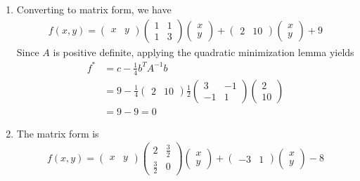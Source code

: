 \documentclass[12pt]{article}
\begin{document}
\begin{problem}[2]
\begin{enumerate}[label=(\alph*)]
	\item Converting to matrix form, we have
	\begin{align*}
		f(x,y) = \begin{pmatrix} x&y \end{pmatrix}  \begin{pmatrix} 1&1\\1&3 \end{pmatrix} \begin{pmatrix} x\\y \end{pmatrix}  + \begin{pmatrix} 2&10 \end{pmatrix}  \begin{pmatrix} x\\y \end{pmatrix} + 9
	\end{align*}
	Since $ A$ is positive definite, applying the quadratic minimization lemma yields 
\begin{align*}
	f^* &= c - \frac{1}{4}b^{T}A^{-1}b\\
	    &= 9 - \frac{1}{4} \begin{pmatrix} 2&10 \end{pmatrix} \frac{1}{2}\begin{pmatrix} 3&-1\\-1&1 \end{pmatrix} \begin{pmatrix} 2\\10 \end{pmatrix}  \\
	    &= 9-9=0 
\end{align*}
\item The matrix form is
	\begin{align*}
	f(x,y) = \begin{pmatrix} x&y \end{pmatrix}  \begin{pmatrix} 2&\frac{3}{2}\\\frac{3}{2}&0 \end{pmatrix} \begin{pmatrix} x\\y \end{pmatrix}  + \begin{pmatrix} -3&1 \end{pmatrix}  \begin{pmatrix} x\\y \end{pmatrix} -8

\end{align*}
\end{enumerate}
\end{problem}
\end{document}

